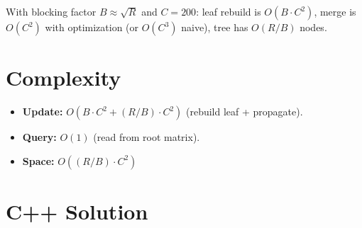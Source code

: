 \documentclass[11pt,a4paper]{article}
\begin{document}
With blocking factor $B \approx \sqrt{R}$ and $C = 200$: leaf rebuild is $O(B \cdot C^2)$, merge is $O(C^2)$ with optimization (or $O(C^3)$ naive), tree has $O(R/B)$ nodes.

\section{Complexity}
\begin{itemize}
    \item \textbf{Update:} $O(B \cdot C^2 + (R/B) \cdot C^2)$ (rebuild leaf + propagate).
    \item \textbf{Query:} $O(1)$ (read from root matrix).
    \item \textbf{Space:} $O((R/B) \cdot C^2)$
\end{itemize}

\section{C++ Solution}
\end{document}
